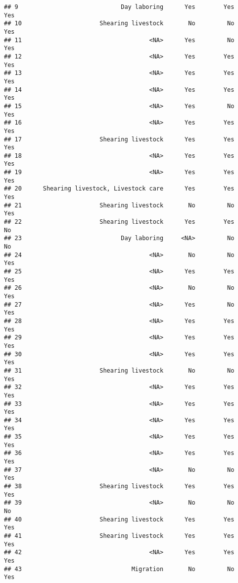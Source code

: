 \documentclass[
]{article}
\begin{document}
\begin{verbatim}
## 9                             Day laboring      Yes        Yes      Yes
## 10                      Shearing livestock       No         No      Yes
## 11                                    <NA>      Yes         No      Yes
## 12                                    <NA>      Yes        Yes      Yes
## 13                                    <NA>      Yes        Yes      Yes
## 14                                    <NA>      Yes        Yes      Yes
## 15                                    <NA>      Yes         No      Yes
## 16                                    <NA>      Yes        Yes      Yes
## 17                      Shearing livestock      Yes        Yes      Yes
## 18                                    <NA>      Yes        Yes      Yes
## 19                                    <NA>      Yes        Yes      Yes
## 20      Shearing livestock, Livestock care      Yes        Yes      Yes
## 21                      Shearing livestock       No         No      Yes
## 22                      Shearing livestock      Yes        Yes       No
## 23                            Day laboring     <NA>         No       No
## 24                                    <NA>       No         No      Yes
## 25                                    <NA>      Yes        Yes      Yes
## 26                                    <NA>       No         No      Yes
## 27                                    <NA>      Yes         No      Yes
## 28                                    <NA>      Yes        Yes      Yes
## 29                                    <NA>      Yes        Yes      Yes
## 30                                    <NA>      Yes        Yes      Yes
## 31                      Shearing livestock       No         No      Yes
## 32                                    <NA>      Yes        Yes      Yes
## 33                                    <NA>      Yes        Yes      Yes
## 34                                    <NA>      Yes        Yes      Yes
## 35                                    <NA>      Yes        Yes      Yes
## 36                                    <NA>      Yes        Yes      Yes
## 37                                    <NA>       No         No      Yes
## 38                      Shearing livestock      Yes        Yes      Yes
## 39                                    <NA>       No         No       No
## 40                      Shearing livestock      Yes        Yes      Yes
## 41                      Shearing livestock      Yes        Yes      Yes
## 42                                    <NA>      Yes        Yes      Yes
## 43                               Migration       No         No      Yes

\end{verbatim}
\end{document}
